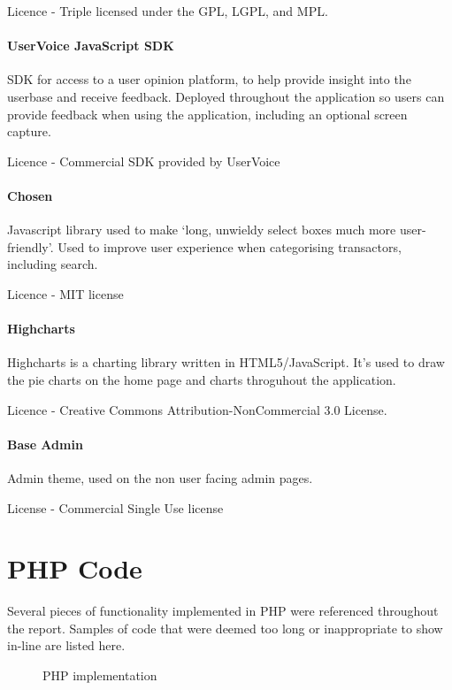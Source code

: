 \begin{appendices}
Licence - Triple licensed under the GPL, LGPL, and MPL.

\subsubsection{UserVoice JavaScript SDK}
SDK for access to a user opinion platform, to help provide insight into the userbase and receive feedback.
%
Deployed throughout the application so users can provide feedback when using the application, including an optional screen capture.

Licence - Commercial SDK provided by UserVoice

\subsubsection{Chosen}
Javascript library used to make `long, unwieldy select boxes much more user-friendly'.
%
Used to improve user experience when categorising transactors, including search.

Licence - MIT license

\subsubsection{Highcharts}
Highcharts is a charting library written in HTML5/JavaScript.
%
It's used to draw the pie charts on the home page and charts throguhout the application.

Licence - Creative Commons Attribution-NonCommercial 3.0 License.

\subsubsection{Base Admin}
Admin theme, used on the non user facing admin pages.

License - Commercial Single Use license

\chapter{PHP Code}
Several pieces of functionality implemented in PHP were referenced throughout the report. Samples of code that were deemed too long or inappropriate to show in-line are listed here.

\pagebreak
\enlargethispage{10\baselineskip}
\begin{figure}[H]

\caption{PHP  implementation}
\label{fig:settransactor}
\end{figure}
\pagebreak


\end{appendices}
